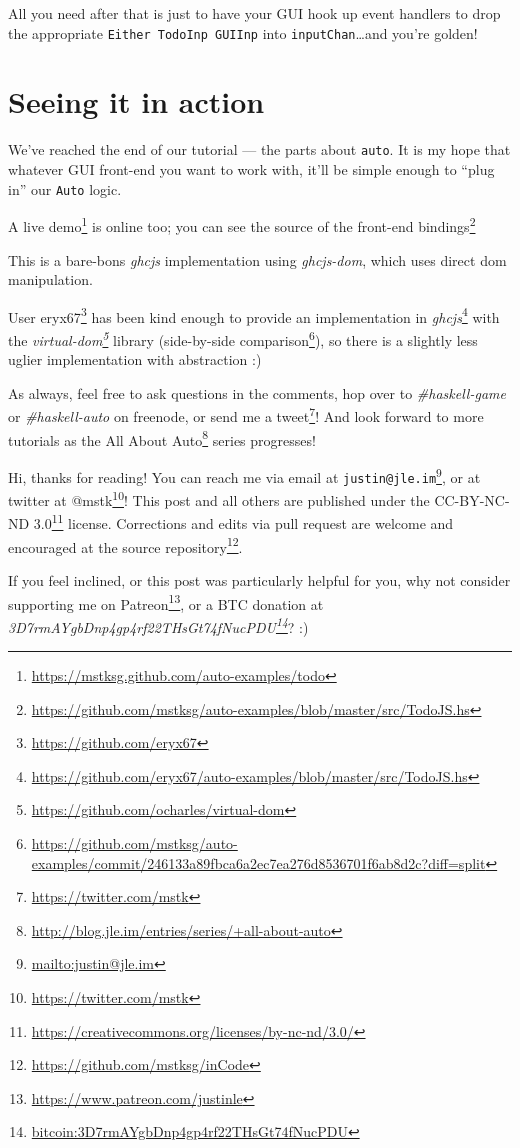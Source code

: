 \documentclass[]{article}
\renewcommand{\href}[2]{#2\footnote{\url{#1}}}
\begin{document}
All you need after that is just to have your GUI hook up event handlers to drop
the appropriate \texttt{Either\ TodoInp\ GUIInp} into
\texttt{inputChan}\ldots{}and you're golden!

\hypertarget{seeing-it-in-action}{%
\section{Seeing it in action}\label{seeing-it-in-action}}

We've reached the end of our tutorial --- the parts about \texttt{auto}. It is
my hope that whatever GUI front-end you want to work with, it'll be simple
enough to ``plug in'' our \texttt{Auto} logic.

A \href{https://mstksg.github.com/auto-examples/todo}{live demo} is online too;
you can see
\href{https://github.com/mstksg/auto-examples/blob/master/src/TodoJS.hs}{the
source of the front-end bindings}

This is a bare-bons \emph{ghcjs} implementation using \emph{ghcjs-dom}, which
uses direct dom manipulation.

User \href{https://github.com/eryx67}{eryx67} has been kind enough to provide
\href{https://github.com/eryx67/auto-examples/blob/master/src/TodoJS.hs}{an
implementation in \emph{ghcjs}} with the
\emph{\href{https://github.com/ocharles/virtual-dom}{virtual-dom}} library
(\href{https://github.com/mstksg/auto-examples/commit/246133a89fbca6a2ec7ea276d8536701f6ab8d2c?diff=split}{side-by-side
comparison}), so there is a slightly less uglier implementation with abstraction
:)

As always, feel free to ask questions in the comments, hop over to
\emph{\#haskell-game} or \emph{\#haskell-auto} on freenode, or send me a
\href{https://twitter.com/mstk}{tweet}! And look forward to more tutorials as
the \href{http://blog.jle.im/entries/series/+all-about-auto}{All About Auto}
series progresses!

Hi, thanks for reading! You can reach me via email at
\href{mailto:justin@jle.im}{\nolinkurl{justin@jle.im}}, or at twitter at
\href{https://twitter.com/mstk}{@mstk}! This post and all others are published
under the \href{https://creativecommons.org/licenses/by-nc-nd/3.0/}{CC-BY-NC-ND
3.0} license. Corrections and edits via pull request are welcome and encouraged
at \href{https://github.com/mstksg/inCode}{the source repository}.

If you feel inclined, or this post was particularly helpful for you, why not
consider \href{https://www.patreon.com/justinle}{supporting me on Patreon}, or a
BTC donation at
\emph{\href{bitcoin:3D7rmAYgbDnp4gp4rf22THsGt74fNucPDU}{3D7rmAYgbDnp4gp4rf22THsGt74fNucPDU}}?
:)
\end{document}
